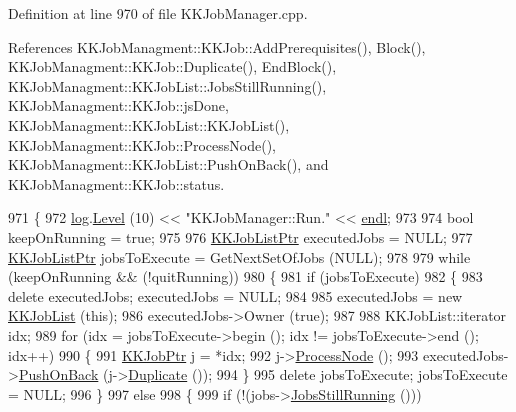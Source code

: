 Definition at line 970 of file K\+K\+Job\+Manager.\+cpp.



References K\+K\+Job\+Managment\+::\+K\+K\+Job\+::\+Add\+Prerequisites(), Block(), K\+K\+Job\+Managment\+::\+K\+K\+Job\+::\+Duplicate(), End\+Block(), K\+K\+Job\+Managment\+::\+K\+K\+Job\+List\+::\+Jobs\+Still\+Running(), K\+K\+Job\+Managment\+::\+K\+K\+Job\+::js\+Done, K\+K\+Job\+Managment\+::\+K\+K\+Job\+List\+::\+K\+K\+Job\+List(), K\+K\+Job\+Managment\+::\+K\+K\+Job\+::\+Process\+Node(), K\+K\+Job\+Managment\+::\+K\+K\+Job\+List\+::\+Push\+On\+Back(), and K\+K\+Job\+Managment\+::\+K\+K\+Job\+::status.


\begin{DoxyCode}
971 \{
972   \hyperlink{class_k_k_job_managment_1_1_k_k_job_ad2466a68d9a01778e0f08af0478b94e5}{log}.\hyperlink{class_k_k_b_1_1_run_log_a32cf761d7f2e747465fd80533fdbb659}{Level} (10) << \textcolor{stringliteral}{"KKJobManager::Run."} << \hyperlink{namespace_k_k_b_ad1f50f65af6adc8fa9e6f62d007818a8}{endl};
973 
974   \textcolor{keywordtype}{bool}  keepOnRunning = \textcolor{keyword}{true};
975 
976   \hyperlink{class_k_k_job_managment_1_1_k_k_job_list}{KKJobListPtr}  executedJobs  = NULL;
977   \hyperlink{class_k_k_job_managment_1_1_k_k_job_list}{KKJobListPtr}  jobsToExecute = GetNextSetOfJobs (NULL);
978 
979   \textcolor{keywordflow}{while}  (keepOnRunning  &&  (!quitRunning))
980   \{
981     \textcolor{keywordflow}{if}  (jobsToExecute)
982     \{
983       \textcolor{keyword}{delete}  executedJobs;  executedJobs = NULL;
984 
985       executedJobs = \textcolor{keyword}{new} \hyperlink{class_k_k_job_managment_1_1_k_k_job_list}{KKJobList} (\textcolor{keyword}{this});
986       executedJobs->Owner (\textcolor{keyword}{true});
987 
988       KKJobList::iterator  idx;
989       \textcolor{keywordflow}{for}  (idx = jobsToExecute->begin ();  idx != jobsToExecute->end ();  idx++)
990       \{
991         \hyperlink{class_k_k_job_managment_1_1_k_k_job}{KKJobPtr}  j = *idx;
992         j->\hyperlink{class_k_k_job_managment_1_1_k_k_job_a609d9e106ff0beb1d258e46b3a8de2db}{ProcessNode} ();
993         executedJobs->\hyperlink{class_k_k_job_managment_1_1_k_k_job_list_abdf9dda2d50a190862d0d82e6597494d}{PushOnBack} (j->\hyperlink{class_k_k_job_managment_1_1_k_k_job_a8565b4f24dbcf979f959850e186cc91d}{Duplicate} ());
994       \}
995       \textcolor{keyword}{delete}  jobsToExecute;  jobsToExecute = NULL;
996     \}
997     \textcolor{keywordflow}{else}
998     \{
999       \textcolor{keywordflow}{if}  (!(jobs->\hyperlink{class_k_k_job_managment_1_1_k_k_job_list_a887c6fe24402c380445f4b89fa952966}{JobsStillRunning} ()))

\end{DoxyCode}
